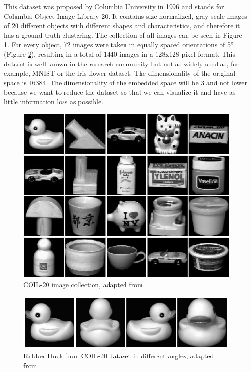 This dataset was proposed by Columbia University in 1996 and stands for Columbia Object Image Library-20. It contains size-normalized, gray-scale images of 20 different objects with different shapes and characteristics, and therefore it has a ground truth clustering. The collection of all images can be seen in Figure \ref{fig:coil-20}. For every object, 72 images were taken in equally spaced orientations of 5° (Figure \ref{fig:coil-20_duck}), resulting in a total of 1440 images in a 128x128 pixel format. This dataset is well known in the research community but not as widely used as, for example, MNIST or the Iris flower dataset. The dimensionality of the original space is 16384. The dimensionality of the embedded space will be 3 and not lower because we want to reduce the dataset so that we can visualize it and have as little information loss as possible. \cite{COIL-20}
\begin{figure}[!]
	\centering
	\includegraphics[width=0.9\columnwidth]{images/coil-20.jpg}
	\caption[COIL-20 Images]{COIL-20 image collection, adapted from \cite{COIL-20}}
    \label{fig:coil-20}
\end{figure}
\begin{figure}[!]
	\centering
	\includegraphics[width=0.9\columnwidth]{images/coil-20_duck.jpg}
	\caption[COIL-20 Duck Images]{Rubber Duck from COIL-20 dataset in different angles, adapted from \cite{COIL-20}}
    \label{fig:coil-20_duck}
\end{figure}

